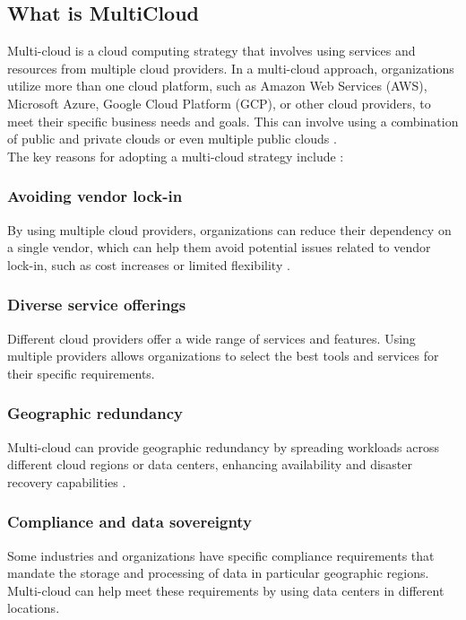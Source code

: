 \subsection{What is MultiCloud}

Multi-cloud is a cloud computing strategy that involves using services and resources from multiple cloud providers. 
In a multi-cloud approach, organizations utilize more than one cloud platform, such as Amazon Web Services (AWS), Microsoft Azure, Google Cloud Platform (GCP), 
or other cloud providers, to meet their specific business needs and goals. 
This can involve using a combination of public and private clouds or even multiple public clouds \cite{WasIstMulticloud}.\\

The key reasons for adopting a multi-cloud strategy include  \cite{hongOverviewMulticloudComputing2019} \cite{BenefitsLimitationsMulticloud}:

\subsubsection{Avoiding vendor lock-in}
By using multiple cloud providers, organizations can reduce their dependency on a single vendor, 
which can help them avoid potential issues related to vendor lock-in, such as cost increases or limited flexibility \cite{pellegriniPreventingVendorLockins2017}.

\subsubsection{Diverse service offerings} 
Different cloud providers offer a wide range of services and features. 
Using multiple providers allows organizations to select the best tools and services for their specific requirements.

\subsubsection{Geographic redundancy} 
Multi-cloud can provide geographic redundancy by spreading workloads across different cloud regions or data centers, 
enhancing availability and disaster recovery capabilities \cite{alzainCloudComputingSecurity2012}.

\subsubsection{Compliance and data sovereignty}
Some industries and organizations have specific compliance requirements that mandate the storage and processing of 
data in particular geographic regions. Multi-cloud can help meet these requirements by using data centers in different locations.

